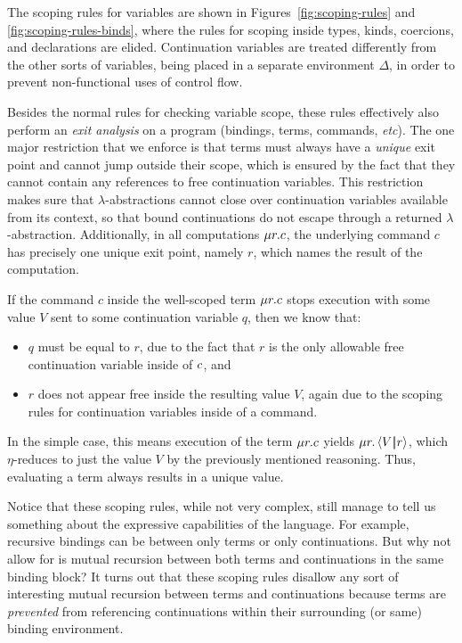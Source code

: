 \documentclass{article}
\begin{document}
The scoping rules for variables are shown in
Figures~\ref{fig:scoping-rules} and \ref{fig:scoping-rules-binds},
where the rules for scoping inside types, kinds, coercions, and
declarations are elided.  Continuation variables are treated
differently from the other sorts of variables, being placed in a
separate environment $\Delta$, in order to prevent non-functional uses
of control flow.

Besides the normal rules for checking variable scope, these rules
effectively also perform an \emph{exit analysis} on a program
(bindings, terms, commands, \emph{etc}).  The one major restriction
that we enforce is that terms must always have a \emph{unique} exit
point and cannot jump outside their scope, which is ensured by the
fact that they cannot contain any references to free continuation
variables.  This restriction makes sure that $\lambda$-abstractions
cannot close over continuation variables available from its context,
so that bound continuations do not escape through a returned
$\lambda$-abstraction.  Additionally, in all computations
$\mu{r}.c$, the underlying command $c$ has precisely one unique
exit point, namely $r$, which names the result of the computation.

If the command $c$ inside the well-scoped term $\mu{r}.c$ stops
execution with some value $V$ sent to some continuation variable $q$,
then we know that:
\begin{itemize}
\item $q$ must be equal to $r$, due to the fact that $r$ is the only
  allowable free continuation variable inside of $c$, and
\item $r$ does not appear free inside the resulting value $V$, again
  due to the scoping rules for continuation variables inside of a
  command.
\end{itemize}
In the simple case, this means execution of the term $\mu{r}.c$
yields $\mu{r}.\left\langle{V}\middle|\!\middle|{r}\right\rangle$, which $\eta$-reduces to just the value
$V$ by the previously mentioned reasoning.  Thus, evaluating a term
always results in a unique value.

Notice that these scoping rules, while not very complex, still manage
to tell us something about the expressive capabilities of the
language.  For example, recursive bindings can be between only terms
or only continuations.  But why not allow for is mutual recursion
between both terms and continuations in the same binding block?  It
turns out that these scoping rules disallow any sort of interesting
mutual recursion between terms and continuations because terms are
\emph{prevented} from referencing continuations within their
surrounding (or same) binding environment.
\end{document}
